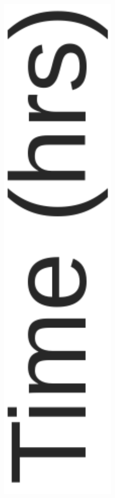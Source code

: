 \begin{figure}[tb]
\begin{minipage}{0.037\textwidth}
\begin{subfigure}{\textwidth}
		\includegraphics[width=\columnwidth]{../img/Experiments/timeh.pdf}

\end{subfigure}
\end{minipage}
\end{figure}
